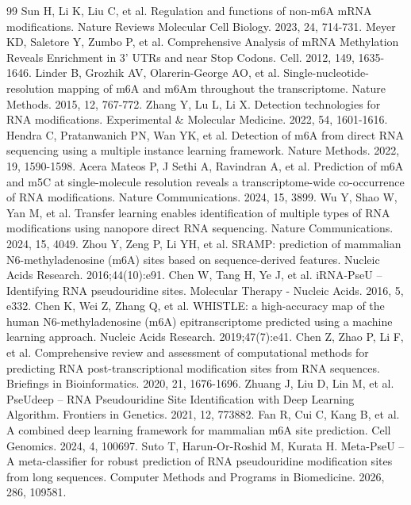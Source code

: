 \documentclass[unnumsec,webpdf,contemporary,large]{oup-authoring-template}
\begin{document}
\begin{thebibliography}{99}
Sun H, Li K, Liu C, et al. Regulation and functions of non-m6A mRNA modifications. Nature Reviews Molecular Cell Biology. 2023, 24, 714-731.
Meyer KD, Saletore Y, Zumbo P, et al. Comprehensive Analysis of mRNA Methylation Reveals Enrichment in 3' UTRs and near Stop Codons. Cell. 2012, 149, 1635-1646.
Linder B, Grozhik AV, Olarerin-George AO, et al. Single-nucleotide-resolution mapping of m6A and m6Am throughout the transcriptome. Nature Methods. 2015, 12, 767-772.
Zhang Y, Lu L, Li X. Detection technologies for RNA modifications. Experimental \& Molecular Medicine. 2022, 54, 1601-1616.
Hendra C, Pratanwanich PN, Wan YK, et al. Detection of m6A from direct RNA sequencing using a multiple instance learning framework. Nature Methods. 2022, 19, 1590-1598.
Acera Mateos P, J Sethi A, Ravindran A, et al. Prediction of m6A and m5C at single-molecule resolution reveals a transcriptome-wide co-occurrence of RNA modifications. Nature Communications. 2024, 15, 3899.
Wu Y, Shao W, Yan M, et al. Transfer learning enables identification of multiple types of RNA modifications using nanopore direct RNA sequencing. Nature Communications. 2024, 15, 4049.
Zhou Y, Zeng P, Li YH, et al. SRAMP: prediction of mammalian N6-methyladenosine (m6A) sites based on sequence-derived features. Nucleic Acids Research. 2016;44(10):e91.
Chen W, Tang H, Ye J, et al. iRNA-PseU -- Identifying RNA pseudouridine sites. Molecular Therapy - Nucleic Acids. 2016, 5, e332.
Chen K, Wei Z, Zhang Q, et al. WHISTLE: a high-accuracy map of the human N6-methyladenosine (m6A) epitranscriptome predicted using a machine learning approach. Nucleic Acids Research. 2019;47(7):e41.
Chen Z, Zhao P, Li F, et al. Comprehensive review and assessment of computational methods for predicting RNA post-transcriptional modification sites from RNA sequences. Briefings in Bioinformatics. 2020, 21, 1676-1696.
Zhuang J, Liu D, Lin M, et al. PseUdeep -- RNA Pseudouridine Site Identification with Deep Learning Algorithm. Frontiers in Genetics. 2021, 12, 773882.
Fan R, Cui C, Kang B, et al. A combined deep learning framework for mammalian m6A site prediction. Cell Genomics. 2024, 4, 100697.
Suto T, Harun-Or-Roshid M, Kurata H. Meta-PseU -- A meta-classifier for robust prediction of RNA pseudouridine modification sites from long sequences. Computer Methods and Programs in Biomedicine. 2026, 286, 109581.

\end{thebibliography}
\end{document}
